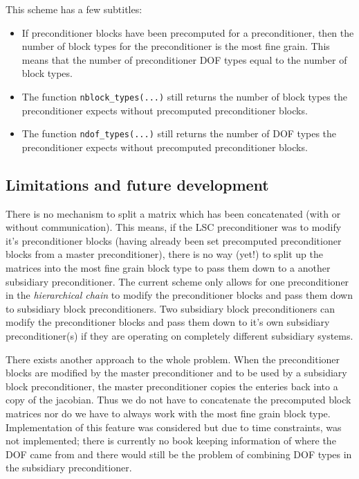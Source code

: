 This scheme has a few subtitles:
\begin{itemize}
\item If preconditioner blocks have been precomputed for a preconditioner, then the number of block types for the preconditioner is the most fine grain. This means that the number of preconditioner DOF types equal to the number of block types.
\item The function \texttt{nblock\-\_types(...)} still returns the number of block types the preconditioner expects without precomputed preconditioner blocks.
\item The function \texttt{ndof\-\_types(...)} still returns the number of DOF types the preconditioner expects without precomputed preconditioner blocks.
\end{itemize}

\subsection{Limitations and future development\label{sec:limitations_and_future_development}}
There is no mechanism to split a matrix which has been concatenated (with or without communication). This means, if the LSC preconditioner was to modify it's preconditioner blocks (having already been set precomputed preconditioner blocks from a master preconditioner), there is no way (yet!) to split up the matrices into the most fine grain block type to pass them down to a another subsidiary preconditioner. The current scheme only allows for one preconditioner in the \emph{hierarchical chain} to modify the preconditioner blocks and pass them down to subsidiary block preconditioners. Two subsidiary block preconditioners can modify the preconditioner blocks and pass them down to it's own subsidiary preconditioner(s) if they are operating on completely different subsidiary systems.

There exists another approach to the whole problem. When the preconditioner blocks are modified by the master preconditioner and to be used by a subsidiary block  preconditioner, the master preconditioner copies the enteries back into a copy of the jacobian. Thus we do not have to concatenate the precomputed block matrices nor do we have to always work with the most fine grain block type. Implementation of this feature was considered but due to time constraints, was not implemented; there is currently no book keeping information of where the DOF came from and there would still be the problem of combining DOF types in the subsidiary preconditioner.

\newpage

%


